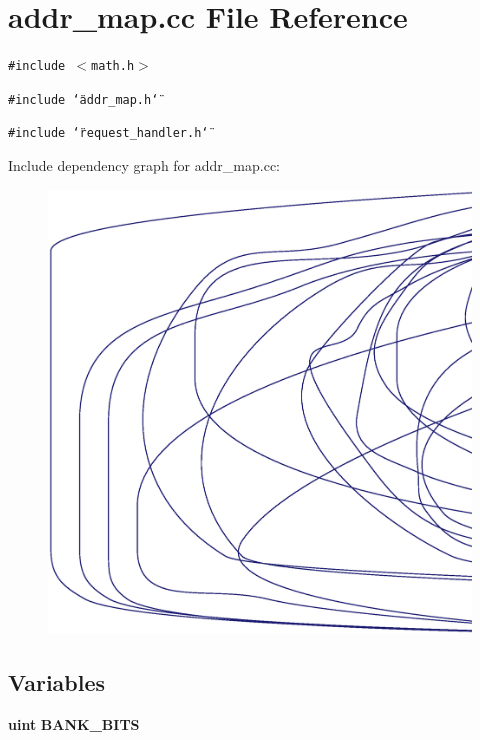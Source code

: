 \section{addr\_\-map.cc File Reference}
\label{addr__map_8cc}
{\tt \#include $<$math.h$>$}\par
{\tt \#include \char`\"{}addr\_\-map.h\char`\"{}}\par
{\tt \#include \char`\"{}request\_\-handler.h\char`\"{}}\par


Include dependency graph for addr\_\-map.cc:\nopagebreak
\begin{figure}[H]
\begin{center}
\leavevmode
\includegraphics[width=420pt]{addr__map_8cc__incl}
\end{center}
\end{figure}
\subsection*{Variables}
\begin{CompactItemize}
\item 
{\bf uint} {\bf BANK\_\-BITS}
\end{CompactItemize}


